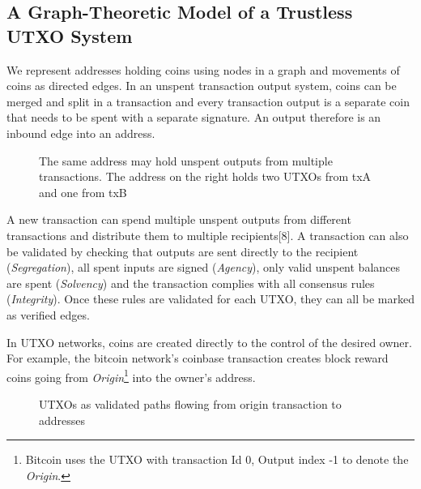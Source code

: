 \documentclass[12pt,a4paper]{article}
\begin{document}
\subsection{A Graph-Theoretic Model of a Trustless UTXO System}
We represent addresses holding coins using nodes in a graph and movements of coins as directed edges. In an unspent transaction output system, coins can be merged and split in a transaction and every transaction output is a separate coin that needs to be spent with a separate signature. An output therefore is an inbound edge into an address.

\begin{figure}[ht]
\begin{center}

\end{center}
\caption{The same address may hold unspent outputs from multiple transactions. The address on the right holds two UTXOs from txA and one from txB }
\end{figure}

A new transaction can spend multiple unspent outputs from different transactions and distribute them to multiple recipients[8]. A transaction can also be validated by checking that outputs are sent directly to the recipient (\emph{Segregation}), all spent inputs are signed (\emph{Agency}), only valid unspent balances are spent (\emph{Solvency}) and the transaction complies with all consensus rules (\emph{Integrity}). Once these rules are validated for each UTXO, they can all be marked as verified edges.

In UTXO networks, coins are created directly to the control of the desired owner. For example, the bitcoin network’s coinbase transaction creates block reward coins going from \emph{Origin}\footnote{Bitcoin uses the UTXO with transaction Id 0, Output index -1 to denote the \emph{Origin}\cite{BTCProtocol}.} into the owner’s address.
\begin{figure}[ht]
\begin{center}

\end{center}
\caption{UTXOs as validated paths flowing from origin transaction to addresses }
\end{figure}
\end{document}
